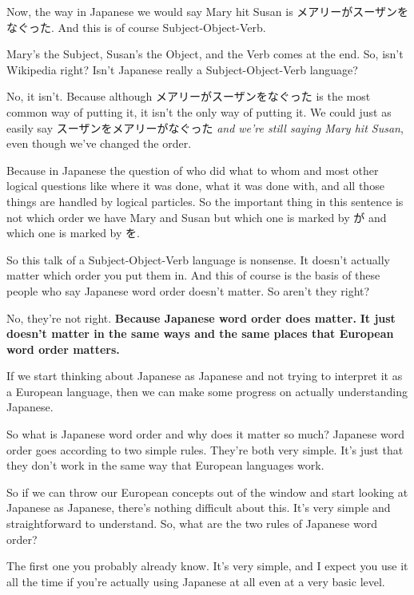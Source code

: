 Now, the way in Japanese we would say Mary hit Susan is メアリーがスーザンをなぐった. And this is of course Subject-Object-Verb.

Mary's the Subject, Susan's the Object, and the Verb comes at the end. So, isn't Wikipedia right? Isn't Japanese really a Subject-Object-Verb language?

No, it isn't. Because although メアリーがスーザンをなぐった is the most common way of putting it, it isn't the only way of putting it. We could just as easily say スーザンをメアリーがなぐった {\em and we're still saying Mary hit Susan}, even though we've changed the order.

{}

Because in Japanese the question of who did what to whom and most other logical questions like where it was done, what it was done with, and all those things are handled by logical particles. So the important thing in this sentence is not which order we have Mary and Susan but which one is marked by が and which one is marked by を.

So this talk of a Subject-Object-Verb language is nonsense. It doesn't actually matter which order you put them in. And this of course is the basis of these people who say Japanese word order doesn't matter. So aren't they right?

No, they're not right. {\bf Because Japanese word order does matter.} {\bf It just doesn't matter in the same ways and the same places that European word order matters.}

If we start thinking about Japanese as Japanese and not trying to interpret it as a European language, then we can make some progress on actually understanding Japanese.

\startsectionlevel[title={Japanese word order rules},reference={japanese-word-order-rules}]

So what is Japanese word order and why does it matter so much? Japanese word order goes according to two simple rules. They're both very simple. It's just that they don't work in the same way that European languages work.

So if we can throw our European concepts out of the window and start looking at Japanese as Japanese, there's nothing difficult about this. It's very simple and straightforward to understand. So, what are the two rules of Japanese word order?

The first one you probably already know. It's very simple, and I expect you use it all the time if you're actually using Japanese at all even at a very basic level.

